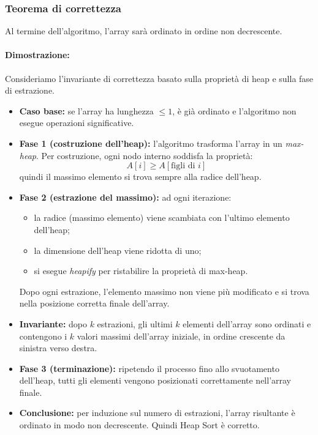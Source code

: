 \documentclass[a4paper,12pt]{article}
\begin{document}
\subsubsection{Teorema di correttezza}
Al termine dell'algoritmo, l'array sarà ordinato in ordine non decrescente.

\paragraph{Dimostrazione:}
Consideriamo l'invariante di correttezza basato sulla proprietà di heap e sulla fase di estrazione.

\begin{itemize}
    \item \textbf{Caso base:} se l'array ha lunghezza $\le 1$, è già ordinato e l'algoritmo non esegue operazioni significative.

    \item \textbf{Fase 1 (costruzione dell'heap):}
    l'algoritmo trasforma l'array in un \textit{max-heap}.  
    Per costruzione, ogni nodo interno soddisfa la proprietà:
    \[
    A[i] \ge A[\text{figli di } i]
    \]
    quindi il massimo elemento si trova sempre alla radice dell'heap.

    \item \textbf{Fase 2 (estrazione del massimo):}
    ad ogni iterazione:
    \begin{itemize}
        \item la radice (massimo elemento) viene scambiata con l'ultimo elemento dell'heap;
        \item la dimensione dell'heap viene ridotta di uno;
        \item si esegue \textit{heapify} per ristabilire la proprietà di max-heap.
    \end{itemize}

    Dopo ogni estrazione, l'elemento massimo non viene più modificato e si trova nella posizione corretta finale dell'array.

    \item \textbf{Invariante:}
    dopo $k$ estrazioni, gli ultimi $k$ elementi dell'array sono ordinati e contengono i $k$ valori massimi dell'array iniziale, in ordine crescente da sinistra verso destra.

    \item \textbf{Fase 3 (terminazione):}
    ripetendo il processo fino allo svuotamento dell'heap, tutti gli elementi vengono posizionati correttamente nell'array finale.

    \item \textbf{Conclusione:}
    per induzione sul numero di estrazioni, l'array risultante è ordinato in modo non decrescente. Quindi Heap Sort è corretto.
\end{itemize}
\end{document}
